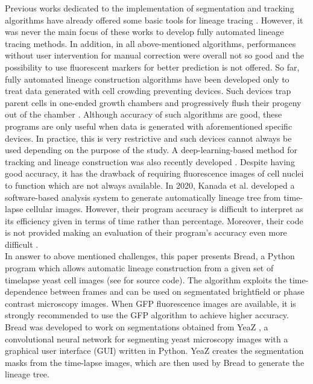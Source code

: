 \documentclass{TP}
\begin{document}
Previous works dedicated to the implementation of segmentation and tracking algorithms have already offered some basic tools for lineage tracing  \cite{cell-acdc} \cite{labrocca} \cite{yeastcell}. However, it was never the main focus of these works to develop fully automated lineage tracing methods. In addition, in all above-mentioned algorithms, performances without user intervention for manual correction were overall not so good and the possibility to use fluorescent markers for better prediction is not offered.
\newline So far, fully automated lineage construction algorithms have been developed only to treat data generated with cell crowding preventing devices. Such devices trap parent cells in one-ended growth chambers and progressively flush their progeny out of the chamber \cite{delta} \cite{kim} \cite{detecdiv}. Although accuracy of such algorithms are good, these programs are only useful when data is generated with aforementioned specific devices. In practice, this is very restrictive and such devices cannot always be used depending on the purpose of the study.
\newline A deep-learning-based method for tracking and lineage construction was also recently developed \cite{deepcell}. Despite having good accuracy, it has the drawback of requiring fluorescence images of cell nuclei to function which are not always available.
\newline In 2020, Kanada et al. developed a software-based analysis system to generate automatically lineage tree from time-lapse cellular images. However, their program accuracy is difficult to interpret as its efficiency given in terms of time rather than percentage. Moreover, their code is not provided making an evaluation of their program's accuracy even more difficult \cite{Kanada}.\\


In answer to above mentioned challenges, this paper presents Bread, a Python program which allows automatic lineage construction from a given set of timelapse yeast cell images (see \cite{lien github} for source code). The algorithm exploits the time-dependence between frames and can be used on segmentated brightfield or phase contrast microscopy images. When GFP fluorescence images are available, it is strongly recommended to use the GFP algorithm to achieve higher accuracy. \\

Bread was developed to work on segmentations obtained from YeaZ \cite{yeaz}, a convolutional neural network for segmenting yeast microscopy images with a graphical user interface (GUI) written in Python. YeaZ creates the segmentation masks from the time-lapse images, which are then used by Bread to generate the lineage tree.
\end{document}
